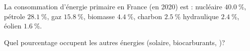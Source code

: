 
La consommation d'énergie primaire en France (en 2020) est  : 
nucléaire $\SI{40,0}{\%}$, 
pétrole $\SI{28,1}{\%}$,
gaz $\SI{15,8}{\%}$,
biomasse $\SI{4,4}{\%}$,
charbon $\SI{2,5}{\%}$
hydraulique $\SI{2,4}{\%}$,
éolien $\SI{1,6}{\%}$.

\debutEntrainement


\begin{enonce}
Quel pourcentage occupent les autres énergies (solaire, %
 biocarburants, \etc)?
\end{enonce}





\finEntrainement











\hauteurLargeurCadreReponse		{8mm}{3cm}
\initialisationEntrainement

